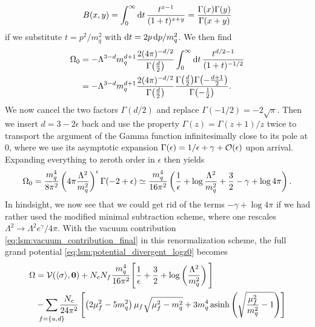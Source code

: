 \begin{equation}
	B(x,y) = \int_0^\infty \mathop{}\!\mathrm{d} t \, \frac{t^{x-1}}{(1+t)^{x+y}} = \frac{\Gamma(x) \Gamma(y)}{\Gamma(x+y)}
\end{equation}
if we substitute $t = p^2/m_q^2$ with $\mathop{}\!\mathrm{d} t = 2 p \mathop{}\!\mathrm{d} p / m_q^2$.
We then find
\begin{equation}
\begin{split}
	\Omega_0 &= -\Lambda^{3-d} m_q^{d+1} \frac{2 (4 \pi)^{-d/2}}{\Gamma\big(\frac{d}{2}\big)} \int_0^\infty \mathop{}\!\mathrm{d} t \, \frac{t^{d/2-1}}{(1+t)^{-1/2}} \\
	         &= -\Lambda^{3-d} m_q^{d+1} \frac{2 (4 \pi)^{-d/2}}{\Gamma\big(\frac{d}{2}\big)} \frac{\Gamma\big(\frac{d}{2}\big) \Gamma\big( \textstyle{-\frac{d+1}{2}} \big)}{\Gamma\big( \textstyle{-\frac{1}{2}} \big)} .
\end{split}
\end{equation}
We now cancel the two factors $\Gamma(d/2)$ and replace $\Gamma(-1/2) = -2\sqrt{\pi}$.
Then we insert $d = 3 - 2 \epsilon$ back and use the property $\Gamma(z) = \Gamma(z+1) / z$ twice to transport the argument of the Gamma function infinitesimally close to its pole at $0$,
where we use its asymptotic expansion $\Gamma(\epsilon) = 1/\epsilon + \gamma + \mathcal{O}(\epsilon)$ upon arrival.
Expanding everything to zeroth order in $\epsilon$ then yields
\begin{equation}
	\Omega_0 =       \frac{m_q^4}{8 \pi^2} \left( 4 \pi \frac{\Lambda^2}{m_q^2} \right)^\epsilon \Gamma(-2 + \epsilon)
	         \simeq \frac{m_q^4}{16 \pi^2} \left( \frac{1}{\epsilon} + \log \frac{\Lambda^2}{m_q^2} + \frac32 - \gamma + \log 4 \pi \right) .
\label{eq:lsm:vacuum_contribution_final}
\end{equation}
In hindsight, we now see that we could get rid of the terms $-\gamma + \log 4 \pi$ if we had rather used the modified minimal subtraction scheme, where one rescales $\Lambda^2 \rightarrow \Lambda^2 e^\gamma / 4 \pi$.
With the vacuum contribution \eqref{eq:lsm:vacuum_contribution_final} in this renormalization scheme, the full grand potential \eqref{eq:lsm:potential_divergent_logz0} becomes
\begin{equation}
\begin{split}
	\Omega &= \pot(\avg{\sigma},\vec{0}) + N_c N_f \frac{m_q^4}{16 \pi^2} \Bigg[ \frac{1}{\epsilon} + \frac{3}{2} + \log\left(\frac{{\Lambda}^2}{m_q^2}\right) \Bigg] \\
	       &- \smashoperator{\sum_{\vphantom{\big|} f=\{u,d\}}} \frac{N_c}{24 \pi^2} \left[ \left( 2 \mu_f^2 - 5 m_q^2 \right) \mu_f \sqrt{\mu_f^2 - m_q^2} + 3 m_q^4 \asinh \left( \sqrt{\frac{\mu_{\smash{f}}^2}{m_q^2}-1} \right) \right]
\end{split}
\label{eq:lsm:grand_potential_nonrenormalized}
\end{equation}
